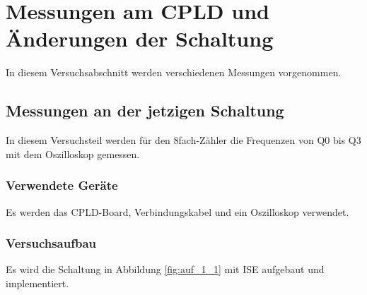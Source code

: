 \documentclass[12pt,a4paper]{article}
\begin{document}
\section{Messungen am CPLD und Änderungen der Schaltung}

In diesem Versuchsabschnitt werden verschiedenen Messungen vorgenommen.

\subsection{Messungen an der jetzigen Schaltung}

In diesem Versuchsteil werden für den 8fach-Zähler die Frequenzen von Q0 bis Q3 mit dem Oszilloskop gemessen.

\subsubsection*{Verwendete Geräte}

Es werden das CPLD-Board, Verbindungskabel und ein Oszilloskop verwendet.

\subsubsection*{Versuchsaufbau}

Es wird die Schaltung in Abbildung \ref{fig:auf_1_1} mit ISE aufgebaut und implementiert.
\end{document}
